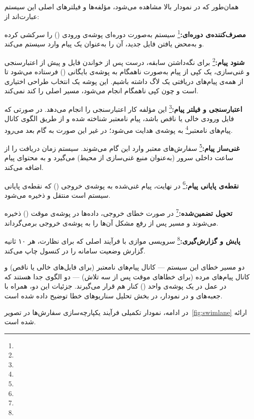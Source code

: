 \documentclass[a4paper,12pt]{article}
\newcommand{\term}[1]{\textbf{\textcolor{sbublue2}{#1:}}}
\begin{document}
همان‌طور که در نمودار بالا مشاهده می‌شود، مؤلفه‌ها و فیلترهای اصلی این سیستم عبارت‌اند از:
\begin{terms}
  \item \term{مصرف‌کننده‌ی دوره‌ای}\footnote{} سیستم به‌صورت دوره‌ای پوشه‌ی ورودی () را سرکشی کرده و به‌محض یافتن فایل جدید، آن را به‌عنوان یک پیام وارد سیستم می‌کند.
  \item \term{شنود پیام}\footnote{} برای نگه‌داشتن سابقه، درست پس از خواندن فایل و پیش از اعتبارسنجی و غنی‌سازی، یک کپی از پیام به‌صورت ناهمگام به پوشه‌ی بایگانی () فرستاده می‌شود تا از همه‌ی پیام‌های دریافتی یک لاگ داشته باشیم. این پوشه یک انتخاب طراحی اختیاری است و چون کپی ناهمگام انجام می‌شود، مسیر اصلی را کند نمی‌کند.
  \item \term{اعتبارسنجی و فیلتر پیام}\footnote{} این مؤلفه کار اعتبارسنجی را انجام می‌دهد. در صورتی که فایل ورودی خالی یا ناقص باشد، پیام نامعتبر شناخته شده و از طریق الگوی کانال پیام‌های نامعتبر\footnote{} به پوشه‌ی  هدایت می‌شود؛ در غیر این صورت به گام بعد می‌رود.
  \item \term{غنی‌ساز پیام}\footnote{} سفارش‌های معتبر وارد این گام می‌شوند. سیستم زمان دریافت را از ساعت داخلی سرور (به‌عنوان منبع غنی‌سازی از محیط) می‌گیرد و به محتوای پیام اضافه می‌کند.
  \item \term{نقطه‌ی پایانی پیام}\footnote{} در نهایت، پیام غنی‌شده به پوشه‌ی خروجی () که نقطه‌ی پایانی سیستم است منتقل و ذخیره می‌شود.
  \item \term{تحویل تضمین‌شده}\footnote{} در صورت خطای خروجی، داده‌ها در پوشه‌ی موقت () ذخیره می‌شوند و مسیر  پس از رفع مشکل آن‌ها را به پوشه‌ی خروجی برمی‌گرداند.
  \item \term{پایش و گزارش‌گیری}\footnote{} سرویسی موازی با فرآیند اصلی که برای نظارت، هر ۱۰ ثانیه گزارش وضعیت سامانه را در کنسول چاپ می‌کند.
\end{terms}

دو مسیر خطای این سیستم — کانال پیام‌های نامعتبر (برای فایل‌های خالی یا ناقص) و کانال پیام‌های مرده (برای خطاهای موقت پس از سه تلاش) — دو الگوی جدا هستند که در عمل در یک پوشه‌ی واحد () کنار هم قرار می‌گیرند. جزئیات این دو، همراه با جعبه‌های  و  در نمودار، در بخش تحلیل سناریوهای خطا توضیح داده شده است.

در ادامه، نمودار  تکمیلی فرآیند یکپارچه‌سازی سفارش‌ها در تصویر~\ref{fig:swimlane} ارائه شده است.
\end{document}
